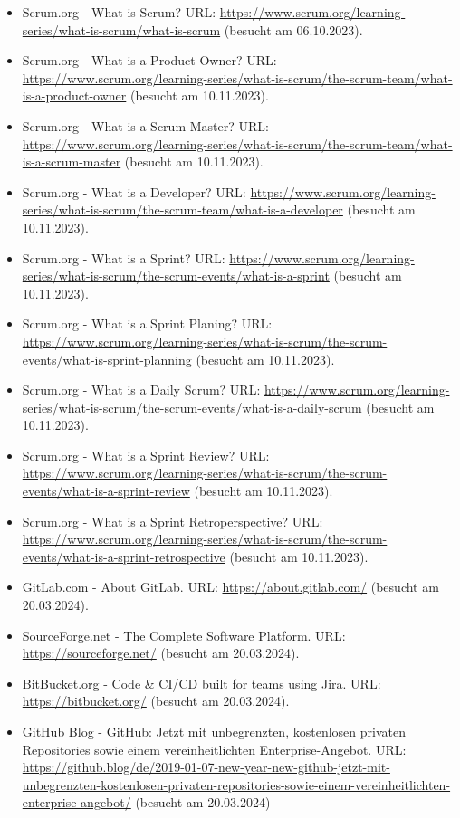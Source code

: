 \begin{itemize}
    \item Scrum.org - What is Scrum? URL: \url{https://www.scrum.org/learning-series/what-is-scrum/what-is-scrum} (besucht am 06.10.2023).
    \item Scrum.org - What is a Product Owner? URL: \url{https://www.scrum.org/learning-series/what-is-scrum/the-scrum-team/what-is-a-product-owner} (besucht am 10.11.2023).
    \item Scrum.org - What is a Scrum Master? URL: \url{https://www.scrum.org/learning-series/what-is-scrum/the-scrum-team/what-is-a-scrum-master} (besucht am 10.11.2023).
    \item Scrum.org - What is a Developer? URL: \url{https://www.scrum.org/learning-series/what-is-scrum/the-scrum-team/what-is-a-developer} (besucht am 10.11.2023).
    \item Scrum.org - What is a Sprint? URL: \url{https://www.scrum.org/learning-series/what-is-scrum/the-scrum-events/what-is-a-sprint} (besucht am 10.11.2023).
    \item Scrum.org - What is a Sprint Planing? URL: \url{https://www.scrum.org/learning-series/what-is-scrum/the-scrum-events/what-is-sprint-planning} (besucht am 10.11.2023).
    \item Scrum.org - What is a Daily Scrum? URL: \url{https://www.scrum.org/learning-series/what-is-scrum/the-scrum-events/what-is-a-daily-scrum} (besucht am 10.11.2023).
    \item Scrum.org - What is a Sprint Review? URL: \url{https://www.scrum.org/learning-series/what-is-scrum/the-scrum-events/what-is-a-sprint-review} (besucht am 10.11.2023).
    \item Scrum.org - What is a Sprint Retroperspective? URL: \url{https://www.scrum.org/learning-series/what-is-scrum/the-scrum-events/what-is-a-sprint-retrospective} (besucht am 10.11.2023).
    \item GitLab.com - About GitLab. URL: \url{https://about.gitlab.com/} (besucht am 20.03.2024).
    \item SourceForge.net - The Complete Software Platform. URL: \url{https://sourceforge.net/} (besucht am 20.03.2024).
    \item BitBucket.org - Code & CI/CD built for teams using Jira. URL: \url{https://bitbucket.org/} (besucht am 20.03.2024).
    \item GitHub Blog - GitHub: Jetzt mit unbegrenzten, kostenlosen privaten Repositories sowie einem vereinheitlichten Enterprise-Angebot. URL: \url{https://github.blog/de/2019-01-07-new-year-new-github-jetzt-mit-unbegrenzten-kostenlosen-privaten-repositories-sowie-einem-vereinheitlichten-enterprise-angebot/} (besucht am 20.03.2024)

\end{itemize}
